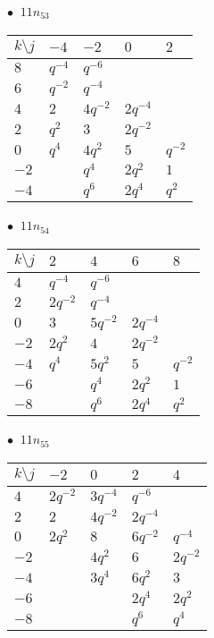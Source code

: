 %
\begin{minipage}{\linewidth}
$\bullet\ $ $11n_{53}$ \vspace{0.5em} \\
\begin{tabular}{l|llll}
$k \setminus j$ & $-4$ & $-2$ & $0$ & $2$ \\
\hline
$8$ & $q^{-4}$ & $q^{-6}$ &  &  \\
$6$ & $q^{-2}$ & $q^{-4}$ &  &  \\
$4$ & $2$ & $4q^{-2}$ & $2q^{-4}$ &  \\
$2$ & $q^{2}$ & $3$ & $2q^{-2}$ &  \\
$0$ & $q^{4}$ & $4q^{2}$ & $5$ & $q^{-2}$ \\
$-2$ &  & $q^{4}$ & $2q^{2}$ & $1$ \\
$-4$ &  & $q^{6}$ & $2q^{4}$ & $q^{2}$ \\
\end{tabular}
\vspace{2em}
\end{minipage}
%
\begin{minipage}{\linewidth}
$\bullet\ $ $11n_{54}$ \vspace{0.5em} \\
\begin{tabular}{l|llll}
$k \setminus j$ & $2$ & $4$ & $6$ & $8$ \\
\hline
$4$ & $q^{-4}$ & $q^{-6}$ &  &  \\
$2$ & $2q^{-2}$ & $q^{-4}$ &  &  \\
$0$ & $3$ & $5q^{-2}$ & $2q^{-4}$ &  \\
$-2$ & $2q^{2}$ & $4$ & $2q^{-2}$ &  \\
$-4$ & $q^{4}$ & $5q^{2}$ & $5$ & $q^{-2}$ \\
$-6$ &  & $q^{4}$ & $2q^{2}$ & $1$ \\
$-8$ &  & $q^{6}$ & $2q^{4}$ & $q^{2}$ \\
\end{tabular}
\vspace{2em}
\end{minipage}
%
\begin{minipage}{\linewidth}
$\bullet\ $ $11n_{55}$ \vspace{0.5em} \\
\begin{tabular}{l|llll}
$k \setminus j$ & $-2$ & $0$ & $2$ & $4$ \\
\hline
$4$ & $2q^{-2}$ & $3q^{-4}$ & $q^{-6}$ &  \\
$2$ & $2$ & $4q^{-2}$ & $2q^{-4}$ &  \\
$0$ & $2q^{2}$ & $8$ & $6q^{-2}$ & $q^{-4}$ \\
$-2$ &  & $4q^{2}$ & $6$ & $2q^{-2}$ \\
$-4$ &  & $3q^{4}$ & $6q^{2}$ & $3$ \\
$-6$ &  &  & $2q^{4}$ & $2q^{2}$ \\
$-8$ &  &  & $q^{6}$ & $q^{4}$ \\
\end{tabular}
\vspace{2em}
\end{minipage}
